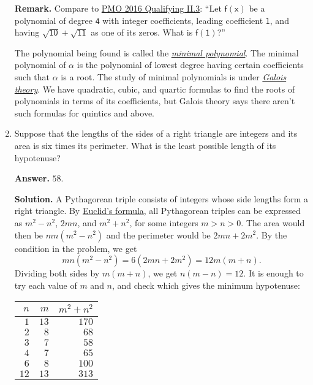 \documentclass[11pt,paper=letter]{scrartcl}
\begin{document}
\begin{enumerate}[left=0pt]
{\small \sffamily \textbf{Remark.} Compare to \href{http://pmo.ph/wp-content/uploads/2015/10/18thPMO-QualifyingRound-Questions.pdf}{PMO 2016 Qualifying II.3}: ``Let $\mathsf{f(x)}$ be a polynomial of degree $\mathsf{4}$ with integer coefficients, leading coefficient $\mathsf{1}$, and having $\mathsf{\sqrt{10} + \sqrt{11}}$ as one of its zeros. What is $\mathsf{f(1)}$?''

The polynomial being found is called the \href{https://en.wikipedia.org/wiki/Minimal_polynomial_(field_theory)}{\emph{minimal polynomial}}. The minimal polynomial of $\mathsf{\alpha}$ is the polynomial of lowest degree having certain coefficients such that $\mathsf{\alpha}$ is a root. The study of minimal polynomials is under \href{https://en.wikipedia.org/wiki/Galois_theory}{\emph{Galois theory}}. We have quadratic, cubic, and quartic formulas to find the roots of polynomials in terms of its coefficients, but Galois theory says there aren't such formulas for quintics and above.}

\item Suppose that the lengths of the sides of a right triangle are integers and its area is six times its perimeter. What is the least possible length of its hypotenuse?

{\sffamily \bfseries Answer.} $\boxed{58}$.

{\sffamily \bfseries Solution.} A Pythagorean triple consists of integers whose side lengths form a right triangle. By \href{https://en.wikipedia.org/wiki/Pythagorean_triple#Generating_a_triple}{Euclid's formula}, all Pythagorean triples can be expressed as $m^2 - n^2$, $2mn$, and $m^2 + n^2$, for some integers $m > n > 0$. The area would then be $mn(m^2 - n^2)$ and the perimeter would be $2mn + 2m^2$. By the condition in the problem, we get $$mn(m^2 - n^2) = 6(2mn + 2m^2) = 12m(m + n).$$ Dividing both sides by $m(m+n)$, we get $n(m-n) = 12$. It is enough to try each value of $m$ and $n$, and check which gives the minimum hypotenuse:

\begin{center}
  \begin{tabular}{rr|r}
    $n$  & $m$   & $m^2 + n^2$ \\ \hline
    $1$  & $13$  & $170$         \\ 
    $2$  & $8$   & $68$         \\ 
    $3$  & $7$   & $58$         \\ 
    $4$  & $7$  & $65$        \\ 
    $6$  & $8$  & $100$        \\ 
    $12$  & $13$  & $313$
  \end{tabular}
\end{center}


\end{enumerate}
\end{document}
